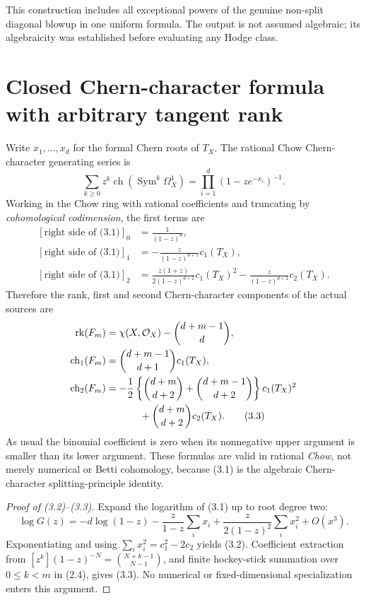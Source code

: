 \documentclass[11pt]{article}
\newcommand{\ch}{\operatorname{ch}}
\newcommand{\Sym}{\operatorname{Sym}}
\newcommand{\rk}{\operatorname{rk}}
\begin{document}
This construction includes all exceptional powers of the genuine
non-split diagonal blowup in one uniform formula. The output is not
assumed algebraic; its algebraicity was established before evaluating
any Hodge class.

\section{Closed Chern-character formula with arbitrary tangent rank}
Write \(x_1,\ldots,x_d\) for the formal Chern roots of \(T_X\).
The rational Chow Chern-character generating series is
\[
 \sum_{k\geq0}z^k\ch(\Sym^k\Omega_X^1)
     =\prod_{i=1}^{d}(1-ze^{-x_i})^{-1}.            \tag{3.1}
\]
Working in the Chow ring with rational coefficients and truncating
by \emph{cohomological codimension}, the first terms are
\[
\begin{split}
 \left[\text{right side of (3.1)}\right]_0
     &=\frac1{(1-z)^d},\\
 \left[\text{right side of (3.1)}\right]_1
     &=-\frac{z}{(1-z)^{d+1}}c_1(T_X),\\
 \left[\text{right side of (3.1)}\right]_2
     &=\frac{z(1+z)}{2(1-z)^{d+2}}c_1(T_X)^2
       -\frac{z}{(1-z)^{d+2}}c_2(T_X).
                                                               \tag{3.2}
\end{split}
\]
Therefore the rank, first and second Chern-character components of
the actual sources are
\[
\begin{split}
 \rk(F_m)
    &=\chi(X,\mathcal O_X)-\binom{d+m-1}{d},\\
 \ch_1(F_m)
    &=\binom{d+m-1}{d+1}c_1(T_X),\\
 \ch_2(F_m)
    &=-\frac12\left\{\binom{d+m}{d+2}
                  +\binom{d+m-1}{d+2}\right\}c_1(T_X)^2\\
    &\hspace{12mm}+\binom{d+m}{d+2}c_2(T_X).
                                                               \tag{3.3}
\end{split}
\]
As usual the binomial coefficient is zero when its nonnegative
upper argument is smaller than its lower argument.
These formulas are valid in rational \emph{Chow}, not merely
numerical or Betti cohomology, because (3.1) is the algebraic
Chern-character splitting-principle identity.

\begin{proof}[Proof of (3.2)--(3.3)]
Expand the logarithm of (3.1) up to root degree two:
\[
 \log G(z)=-d\log(1-z)
      -\frac{z}{1-z}\sum_i x_i
      +\frac{z}{2(1-z)^2}\sum_i x_i^2
      +O(x^3).
\]
Exponentiating and using
\(\sum_i x_i^2=c_1^2-2c_2\) yields (3.2).
Coefficient extraction from
\([z^k](1-z)^{-N}=\binom{N+k-1}{N-1}\),
and finite hockey-stick summation over \(0\leq k<m\)
in (2.4), gives (3.3). No numerical or fixed-dimensional
specialization enters this argument.
\end{proof}
\end{document}
